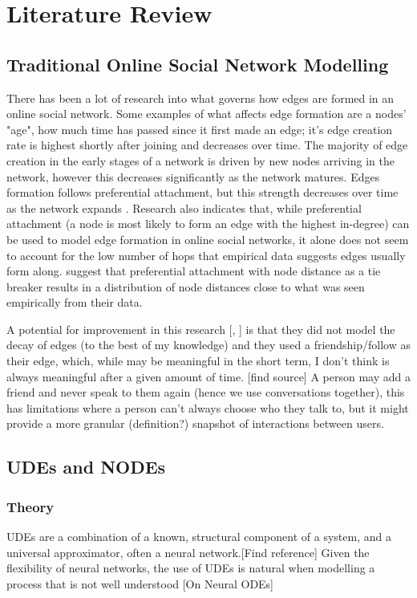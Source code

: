 \documentclass[12pt]{article}
\begin{document}
    
\section{Literature Review}
\subsection{Traditional Online Social Network Modelling}
    There has been a lot of research into what governs how edges are formed in an online social network. Some examples of what affects edge formation are a nodes' "age", how much time has passed since it first made an edge; it's edge creation rate is highest shortly after joining and decreases over time. The majority of edge creation in the early stages of a network is driven by new nodes arriving in the network, however this decreases significantly as the network matures. Edges formation follows preferential attachment, but this strength decreases over time as the network expands \cite{zhao2012multi}. Research also indicates that, while preferential attachment (a node is most likely to form an edge with the highest in-degree) can be used to model edge formation in online social networks, it alone does not seem to account for the low number of hops that empirical data suggests edges usually form along. \cite{garg2009evolution} suggest that preferential attachment with node distance as a tie breaker results in a distribution of node distances close to what was seen empirically from  their data.
    
    A potential for improvement in this research [\cite{garg2009evolution}, \cite{zhao2012multi}] is that they did not model the decay of edges (to the best of my knowledge) and they used a friendship/follow as their edge, which, while may be meaningful in the short term, I don't think is always meaningful after a given amount of time. [find source] A person may add a friend and never speak to them again (hence we use conversations together), this has limitations where a person can't always choose who they talk to, but it might provide a more granular (definition?) snapshot of interactions between users.
\subsection{UDEs and NODEs}
  \subsubsection{Theory}
     UDEs are a combination of a known, structural component of a system, and a universal approximator, often a neural network.[Find reference]
     Given the flexibility of neural networks, the use of UDEs is natural when modelling a process that is not well understood [On Neural ODEs]
     
\end{document}
